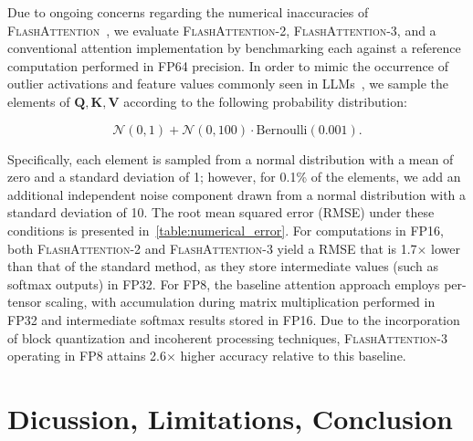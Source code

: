 Due to ongoing concerns regarding the numerical inaccuracies of \textsc{FlashAttention}~\citep{golden2024flash}, we evaluate \textsc{FlashAttention-2}, \textsc{FlashAttention-3}, and a conventional attention implementation by benchmarking each against a reference computation performed in FP64 precision. In order to mimic the occurrence of outlier activations and feature values commonly seen in LLMs~\citep{dettmers2208llm, sun2024massive}, we sample the elements of $\mathbf{Q}, \mathbf{K}, \mathbf{V}$ according to the following probability distribution:

\begin{equation*}
  \mathcal{N}(0, 1) + \mathcal{N}(0, 100) \cdot \mathrm{Bernoulli}(0.001).
\end{equation*}

Specifically, each element is sampled from a normal distribution with a mean of zero and a standard deviation of 1; however, for 0.1\% of the elements, we add an additional independent noise component drawn from a normal distribution with a standard deviation of 10. The root mean squared error (RMSE) under these conditions is presented in~\cref{table:numerical_error}. For computations in FP16, both \textsc{FlashAttention-2} and \textsc{FlashAttention-3} yield a RMSE that is 1.7$\times$ lower than that of the standard method, as they store intermediate values (such as softmax outputs) in FP32. For FP8, the baseline attention approach employs per-tensor scaling, with accumulation during matrix multiplication performed in FP32 and intermediate softmax results stored in FP16. Due to the incorporation of block quantization and incoherent processing techniques, \textsc{FlashAttention-3} operating in FP8 attains 2.6$\times$ higher accuracy relative to this baseline.

\section{Dicussion, Limitations, Conclusion}
\label{sec:discussion}

